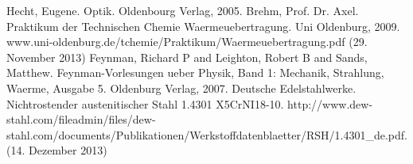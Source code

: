 \pagebreak
\begin{thebibliography}{9}
 Hecht, Eugene. Optik. Oldenbourg Verlag, 2005.
 Brehm, Prof. Dr. Axel. Praktikum der Technischen Chemie Waermeuebertragung. Uni Oldenburg, 2009. www.uni-oldenburg.de/tchemie/Praktikum/Waermeuebertragung.pdf (29. November 2013)
Feynman, Richard P and Leighton, Robert B and Sands, Matthew. Feynman-Vorlesungen ueber Physik, Band 1: Mechanik, Strahlung, Waerme, Ausgabe 5. Oldenburg Verlag, 2007.
 Deutsche Edelstahlwerke. Nichtrostender austenitischer Stahl 1.4301 X5CrNI18-10. http://www.dew-stahl.com/fileadmin/files/dew-stahl.com/documents/Publikationen/Werkstoffdatenblaetter/RSH/1.4301\_de.pdf. (14. Dezember 2013)
\end{thebibliography}